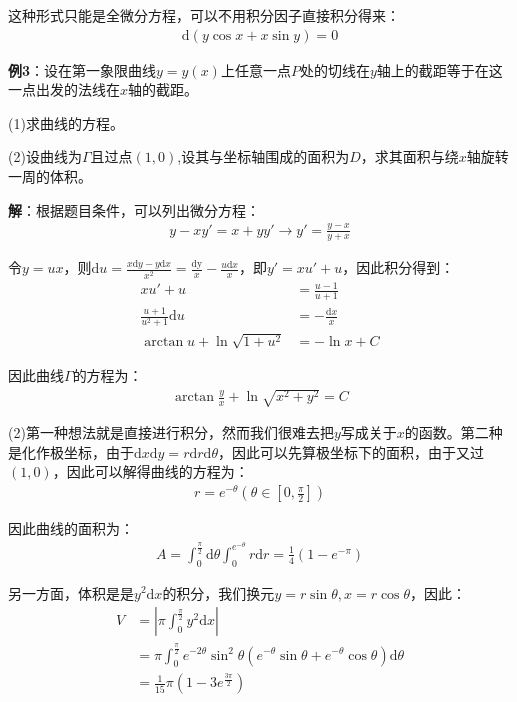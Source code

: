 \documentclass{ctexart}
\let\oldtextbf\textbf
\renewcommand{\textbf}[1]{\textcolor{brown!50!red}{\oldtextbf{#1}}}
\begin{document}
这种形式只能是全微分方程，可以不用积分因子直接积分得来：
\begin{align*}
    \mathrm{d}(y\cos x+x\sin y)=0
\end{align*}

\textbf{\color{brown!50!red}例3}：设在第一象限曲线$y=y(x)$上任意一点$P$处的切线在$y$轴上的截距等于在这一点出发的法线在$x$轴的截距。

(1)求曲线的方程。

(2)设曲线为$\Gamma$且过点$(1,0)$,设其与坐标轴围成的面积为$D$，求其面积与绕$x$轴旋转一周的体积。

\textbf{\color{brown!50!red}解}：根据题目条件，可以列出微分方程：
\begin{align*}
   y-xy'=x+yy'\to y'=\frac{y-x}{y+x}   
\end{align*}

令$y=ux$，则$\mathrm{d}u=\frac{x\mathrm{d}y-y\mathrm{d}x}{x^2}=\frac{\mathrm{dy}}{x}-\frac{u\mathrm{d}x}{x}$，即$y'=xu'+u$，因此积分得到：
\begin{align*}
   xu'+u&=\frac{u-1}{u+1} \\
\frac{u+1}{u^2+1}\mathrm{d}u&=-\frac{\mathrm{d}x }{x}\\ 
\arctan u+\ln\sqrt{1+u^2}&=-\ln{x}+C    
\end{align*}

因此曲线$\Gamma$的方程为：
\begin{align*}
    \arctan \frac{y}{x}+\ln\sqrt{x^2+y^2}=C
\end{align*}

(2)第一种想法就是直接进行积分，然而我们很难去把$y$写成关于$x$的函数。第二种是化作极坐标，由于$\mathrm{d}x\mathrm{d}y=r\mathrm{d}r\mathrm{d}\theta$，因此可以先算极坐标下的面积，由于又过$(1,0)$，因此可以解得曲线的方程为：
\begin{align*}
    r=e^{-\theta}(\theta\in[0,\frac{\pi}{2}])
\end{align*}

因此曲线的面积为：
\begin{align*}
    A=\int_0^{\frac{\pi}{2}}\mathrm{d}\theta \int_0^{e^{-\theta}}r\mathrm{d}r=\frac{1}{4}(1-e^{-\pi})  
\end{align*}

另一方面，体积是是$y^2\mathrm{d}x$的积分，我们换元$y=r\sin\theta,x=r\cos\theta$，因此：
\begin{align*}
    V&=\left|\pi\int_0^\frac{\pi}{2}y
^2\mathrm{d}x\right|\\
 &=\pi\int_0^\frac{\pi}{2}e^{-2\theta}\sin^2\theta(e^{-\theta}\sin\theta+e^{-\theta}\cos\theta)
\mathrm{d}\theta\\
&=\frac{1}{15}\pi(1-3e^\frac{3\pi}{2})  
\end{align*}
\end{document}
